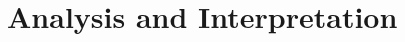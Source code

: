 \documentclass[conference]{IEEEtran}
\begin{document}
\section{Analysis and Interpretation}
%
%
%
%
%
%
\end{document}
